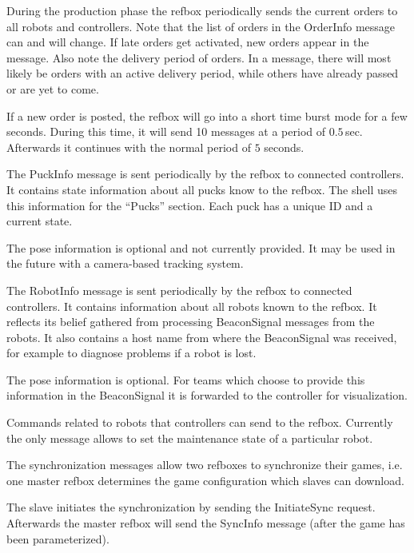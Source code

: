 \documentclass[a4paper]{article}
\begin{document}
%
{%
  During the production phase the refbox periodically sends the
  current orders to all robots and controllers. Note that the list of
  orders in the OrderInfo message can and will change. If late orders
  get activated, new orders appear in the message. Also note the
  delivery period of orders. In a message, there will most likely be
  orders with an active delivery period, while others have already
  passed or are yet to come.

  \medskip

  If a new order is posted, the refbox will go into a short time burst
  mode for a few seconds. During this time, it will send 10 messages
  at a period of $0.5$\,sec. Afterwards it continues with the normal
  period of $5$ seconds.
}

%
{%
  The PuckInfo message is sent periodically by the refbox to connected
  controllers. It contains state information about all pucks know to
  the refbox. The shell uses this information for the ``Pucks''
  section. Each puck has a unique ID and a current state.

  \medskip

  The pose information is optional and not currently provided. It may
  be used in the future with a camera-based tracking system.
}

%
{%
  The RobotInfo message is sent periodically by the refbox to
  connected controllers. It contains information about all robots
  known to the refbox. It reflects its belief gathered from processing
  BeaconSignal messages from the robots. It also contains a host name
  from where the BeaconSignal was received, for example to diagnose
  problems if a robot is lost.

  \medskip

  The pose information is optional. For teams which choose to provide
  this information in the BeaconSignal it is forwarded to the
  controller for visualization.
}

%
{%
  Commands related to robots that controllers can send to the
  refbox. Currently the only message allows to set the maintenance
  state of a particular robot.
}

%
{%
  The synchronization messages allow two refboxes to synchronize their
  games, i.e. one master refbox determines the game configuration
  which slaves can download.

  \medskip
  The slave initiates the synchronization by sending the InitiateSync
  request. Afterwards the master refbox will send the SyncInfo message
  (after the game has been parameterized).
}
\end{document}
